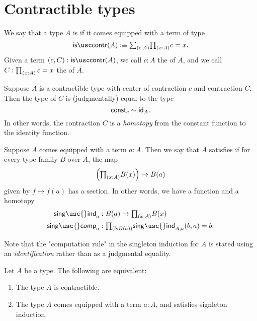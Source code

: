 \section{Contractible types}

\begin{defn}
  We say that a type $A$ is  if it comes equipped with a term of type
  \begin{equation*}
    \iscontr(A) \defeq \sm{c:A}\prd{x:A}c=x.
  \end{equation*}
  Given a term $(c,C):\iscontr(A)$, we call $c:A$ the  of $A$, and we call $C:\prd{x:A}c=x$ the  of $A$.
\end{defn}

\begin{rmk}
Suppose $A$ is a contractible type with center of contraction $c$ and contraction $C$. Then the type of $C$ is (judgmentally) equal to the type
\begin{equation*}
\mathsf{const}_c\htpy\idfunc[A].
\end{equation*}
In other words, the contraction $C$ is a \emph{homotopy} from the constant function to the identity function.
\end{rmk}

\begin{defn}
  Suppose $A$ comes equipped with a term $a:A$. Then we say that $A$ satisfies  if for every type family $B$ over $A$, the map
\begin{equation*}
\Big(\prd{x:A}B(x)\Big)\to B(a)
\end{equation*}
given by $f\mapsto f(a)$ has a section. In other words, we have a function and a homotopy
\begin{align*}
\mathsf{sing\usc{}ind}_{a} & : B(a)\to \prd{x:A}B(x) \\
\mathsf{sing\usc{}comp}_{a} & : \prd{b:B(a)} \mathsf{sing\usc{}ind}_{A,a}(b,a)=b.
\end{align*}
\end{defn}

\begin{rmk}
  Note that the "computation rule" in the singleton induction for $A$ is stated using an \emph{identification} rather than as a judgmental equality. 
\end{rmk}

\begin{thm}\label{thm:contractible}
Let $A$ be a type. The following are equivalent:
\begin{enumerate}
\item The type $A$ is contractible.
\item The type $A$ comes equipped with a term $a:A$, and satisfies signleton induction.
\end{enumerate}
\end{thm}

